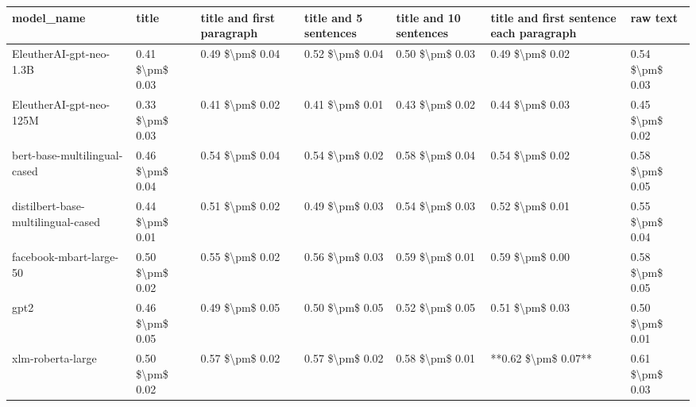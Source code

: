 \begin{tabular}{lllllll}
\toprule
                        model\_name &           title & title and first paragraph & title and 5 sentences & title and 10 sentences & title and first sentence each paragraph &        raw text \\
\midrule
           EleutherAI-gpt-neo-1.3B & 0.41 \$\textbackslash pm\$ 0.03 &           0.49 \$\textbackslash pm\$ 0.04 &       0.52 \$\textbackslash pm\$ 0.04 &        0.50 \$\textbackslash pm\$ 0.03 &                         0.49 \$\textbackslash pm\$ 0.02 & 0.54 \$\textbackslash pm\$ 0.03 \\
           EleutherAI-gpt-neo-125M & 0.33 \$\textbackslash pm\$ 0.03 &           0.41 \$\textbackslash pm\$ 0.02 &       0.41 \$\textbackslash pm\$ 0.01 &        0.43 \$\textbackslash pm\$ 0.02 &                         0.44 \$\textbackslash pm\$ 0.03 & 0.45 \$\textbackslash pm\$ 0.02 \\
      bert-base-multilingual-cased & 0.46 \$\textbackslash pm\$ 0.04 &           0.54 \$\textbackslash pm\$ 0.04 &       0.54 \$\textbackslash pm\$ 0.02 &        0.58 \$\textbackslash pm\$ 0.04 &                         0.54 \$\textbackslash pm\$ 0.02 & 0.58 \$\textbackslash pm\$ 0.05 \\
distilbert-base-multilingual-cased & 0.44 \$\textbackslash pm\$ 0.01 &           0.51 \$\textbackslash pm\$ 0.02 &       0.49 \$\textbackslash pm\$ 0.03 &        0.54 \$\textbackslash pm\$ 0.03 &                         0.52 \$\textbackslash pm\$ 0.01 & 0.55 \$\textbackslash pm\$ 0.04 \\
           facebook-mbart-large-50 & 0.50 \$\textbackslash pm\$ 0.02 &           0.55 \$\textbackslash pm\$ 0.02 &       0.56 \$\textbackslash pm\$ 0.03 &        0.59 \$\textbackslash pm\$ 0.01 &                         0.59 \$\textbackslash pm\$ 0.00 & 0.58 \$\textbackslash pm\$ 0.05 \\
                              gpt2 & 0.46 \$\textbackslash pm\$ 0.05 &           0.49 \$\textbackslash pm\$ 0.05 &       0.50 \$\textbackslash pm\$ 0.05 &        0.52 \$\textbackslash pm\$ 0.05 &                         0.51 \$\textbackslash pm\$ 0.03 & 0.50 \$\textbackslash pm\$ 0.01 \\
                 xlm-roberta-large & 0.50 \$\textbackslash pm\$ 0.02 &           0.57 \$\textbackslash pm\$ 0.02 &       0.57 \$\textbackslash pm\$ 0.02 &        0.58 \$\textbackslash pm\$ 0.01 &                     **0.62 \$\textbackslash pm\$ 0.07** & 0.61 \$\textbackslash pm\$ 0.03 \\
\bottomrule
\end{tabular}
